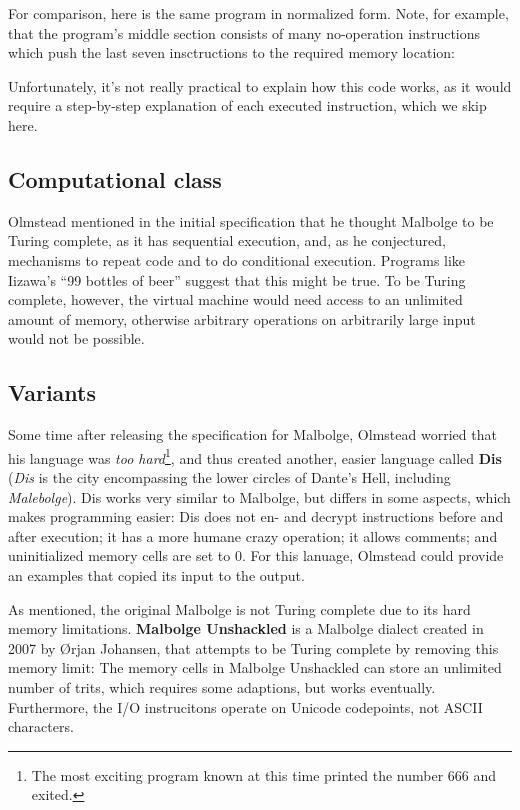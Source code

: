 For comparison, here is the same program in normalized form. Note, for example, that the program's middle section consists of many no-operation instructions which push the last seven insctructions to the required memory location:



Unfortunately, it's not really practical to explain how this code works, as it would require a step-by-step explanation of each executed instruction, which we skip here.

\subsection{Computational class}

Olmstead mentioned in the initial specification that he thought Malbolge to be Turing complete, as it has sequential execution, and, as he conjectured, mechanisms to repeat code and to do conditional execution. Programs like Iizawa's “99 bottles of beer” suggest that this might be true. To be Turing complete, however, the virtual machine would need access to an unlimited amount of memory, otherwise arbitrary operations on arbitrarily large input would not be possible.

\subsection{Variants}

Some time after releasing the specification for Malbolge, Olmstead worried that his language was \emph{too hard}\footnote{The most exciting program known at this time printed the number 666 and exited.}, and thus created another, easier language called \textbf{Dis} (\emph{Dis} is the city encompassing the lower circles of Dante's Hell, including \emph{Malebolge}). Dis works very similar to Malbolge, but differs in some aspects, which makes programming easier: Dis does not en- and decrypt instructions before and after execution; it has a more humane crazy operation; it allows comments; and uninitialized memory cells are set to 0. For this lanuage, Olmstead could provide an examples that copied its input to the output.

As mentioned, the original Malbolge is not Turing complete due to its hard memory limitations. \textbf{Malbolge Unshackled} is a Malbolge dialect created in 2007 by Ørjan Johansen, that attempts to be Turing complete by removing this memory limit: The memory cells in Malbolge Unshackled can store an unlimited number of trits, which requires some adaptions, but works eventually. Furthermore, the I/O instrucitons operate on Unicode codepoints, not ASCII characters.

